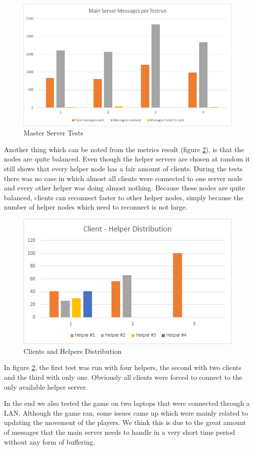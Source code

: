 \begin{figure}[ht]
\centering
\includegraphics[scale=0.8]{images/master_hist.png}
\caption{Master Server Tests}
\label{master_hist}
\end{figure}

Another thing which can be noted from the metrics result (figure \ref{client_helper}), is that the nodes are quite balanced.
Even though the helper servers are chosen at random it still shows that every helper node has a fair amount of clients.
During the tests there was no case in which almost all clients were connected to one server node and every other helper was doing almost nothing.
Because these nodes are quite balanced, clients can reconnect faster to other helper nodes, simply because the number of helper nodes which need to reconnect is not large.

\begin{figure}[!ht]
\centering
\includegraphics[scale=0.8]{images/client_helper.png}
\caption{Clients and Helpers Distribution}
\label{client_helper}
\end{figure}

In figure \ref{client_helper}, the first test was run with four helpers, the second with two clients and the third with only one.
Obviously all clients were forced to connect to the only available helper server.

In the end we also tested the game on two laptops that were connected through a LAN. Although the game ran, some issues came up which were mainly related to updating the movement of the players. We think this is due to the great amount of messages that the main server needs to handle in a very short time period without any form of buffering.

